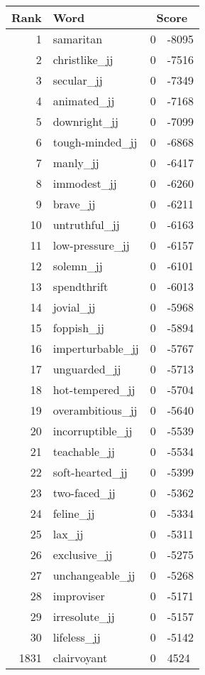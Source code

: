 \begin{longtable}[!htbp]{| rlr@{.}l |}
    \hline
    \textbf{Rank} & \textbf{Word} & \multicolumn{2}{c|}{\textbf{Score}} \\
    \hline
    \endhead
    1 & samaritan & 0 & -8095 \\
    2 & christlike\_jj & 0 & -7516 \\
    3 & secular\_jj & 0 & -7349 \\
    4 & animated\_jj & 0 & -7168 \\
    5 & downright\_jj & 0 & -7099 \\
    6 & tough-minded\_jj & 0 & -6868 \\
    7 & manly\_jj & 0 & -6417 \\
    8 & immodest\_jj & 0 & -6260 \\
    9 & brave\_jj & 0 & -6211 \\
    10 & untruthful\_jj & 0 & -6163 \\
    11 & low-pressure\_jj & 0 & -6157 \\
    12 & solemn\_jj & 0 & -6101 \\
    13 & spendthrift & 0 & -6013 \\
    14 & jovial\_jj & 0 & -5968 \\
    15 & foppish\_jj & 0 & -5894 \\
    16 & imperturbable\_jj & 0 & -5767 \\
    17 & unguarded\_jj & 0 & -5713 \\
    18 & hot-tempered\_jj & 0 & -5704 \\
    19 & overambitious\_jj & 0 & -5640 \\
    20 & incorruptible\_jj & 0 & -5539 \\
    21 & teachable\_jj & 0 & -5534 \\
    22 & soft-hearted\_jj & 0 & -5399 \\
    23 & two-faced\_jj & 0 & -5362 \\
    24 & feline\_jj & 0 & -5334 \\
    25 & lax\_jj & 0 & -5311 \\
    26 & exclusive\_jj & 0 & -5275 \\
    27 & unchangeable\_jj & 0 & -5268 \\
    28 & improviser & 0 & -5171 \\
    29 & irresolute\_jj & 0 & -5157 \\
    30 & lifeless\_jj & 0 & -5142 \\
    1831 & clairvoyant & 0 & 4524 \\

\end{longtable}
